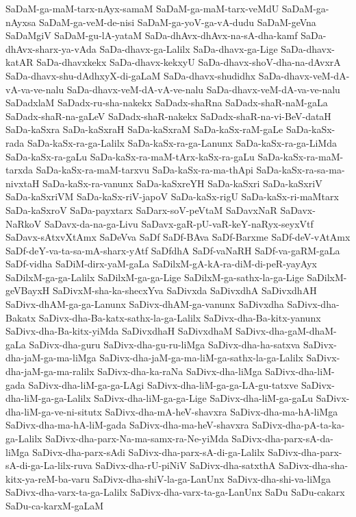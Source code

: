 {SaDaM-ga-maM-tarx-nAyx-samaM
SaDaM-ga-maM-tarx-veMdU
SaDaM-ga-nAyxsa
SaDaM-ga-veM-de-nisi
SaDaM-ga-yoV-ga-vA-dudu
SaDaM-geVna
SaDaMgiV
SaDaM-gu-lA-yataM
SaDa-dhAvx-dhAvx-na-sA-dha-kamf
SaDa-dhAvx-sharx-ya-vAda
SaDa-dhavx-ga-Lalilx
SaDa-dhavx-ga-Lige
SaDa-dhavx-katAR
SaDa-dhavxkekx
SaDa-dhavx-kekxyU
SaDa-dhavx-shoV-dha-na-dAvxrA
SaDa-dhavx-shu-dAdhxyX-di-gaLaM
SaDa-dhavx-shudidhx
SaDa-dhavx-veM-dA-vA-va-ve-nalu
SaDa-dhavx-veM-dA-vA-ve-nalu
SaDa-dhavx-veM-dA-va-ve-nalu
SaDadxlaM
SaDadx-ru-sha-nakekx
SaDadx-shaRna
SaDadx-shaR-naM-gaLa
SaDadx-shaR-na-gaLeV
SaDadx-shaR-nakekx
SaDadx-shaR-na-vi-BeV-dataH
SaDa-kaSxra
SaDa-kaSxraH
SaDa-kaSxraM
SaDa-kaSx-raM-gaLe
SaDa-kaSx-rada
SaDa-kaSx-ra-ga-Lalilx
SaDa-kaSx-ra-ga-Lanunx
SaDa-kaSx-ra-ga-LiMda
SaDa-kaSx-ra-gaLu
SaDa-kaSx-ra-maM-tArx-kaSx-ra-gaLu
SaDa-kaSx-ra-maM-tarxda
SaDa-kaSx-ra-maM-tarxvu
SaDa-kaSx-ra-ma-thApi
SaDa-kaSx-ra-sa-ma-nivxtaH
SaDa-kaSx-ra-vanunx
SaDa-kaSxreYH
SaDa-kaSxri
SaDa-kaSxriV
SaDa-kaSxriVM
SaDa-kaSx-riV-japoV
SaDa-kaSx-rigU
SaDa-kaSx-ri-maMtarx
SaDa-kaSxroV
SaDa-payxtarx
SaDarx-soV-peVtaM
SaDavxNaR
SaDavx-NaRkoV
SaDavx-da-na-ga-Livu
SaDavx-gaR-pU-vaR-keY-naRyx-seyxVtf
SaDavx-sAtxvXtAmx
SaDeVva
SaDf
SaDf-BAva
SaDf-Barxme
SaDf-deV-vAtAmx
SaDf-deY-va-ta-sa-mA-sharx-yAtf
SaDfdhA
SaDf-vaNaRH
SaDf-va-gaRM-gaLa
SaDf-vidha
SaDiM-dirx-yaM-gaLa
SaDilxM-gA-kA-ra-diM-di-peR-yayAyx
SaDilxM-ga-ga-Lalilx
SaDilxM-ga-ga-Lige
SaDilxM-ga-sathx-la-ga-Lige
SaDilxM-geVBayxH
SaDivxM-sha-ka-shecxYva
SaDivxda
SaDivxdhA
SaDivxdhAH
SaDivx-dhAM-ga-ga-Lanunx
SaDivx-dhAM-ga-vanunx
SaDivxdha
SaDivx-dha-Bakatx
SaDivx-dha-Ba-katx-sathx-la-ga-Lalilx
SaDivx-dha-Ba-kitx-yanunx
SaDivx-dha-Ba-kitx-yiMda
SaDivxdhaH
SaDivxdhaM
SaDivx-dha-gaM-dhaM-gaLa
SaDivx-dha-guru
SaDivx-dha-gu-ru-liMga
SaDivx-dha-ha-satxva
SaDivx-dha-jaM-ga-ma-liMga
SaDivx-dha-jaM-ga-ma-liM-ga-sathx-la-ga-Lalilx
SaDivx-dha-jaM-ga-ma-ralilx
SaDivx-dha-ka-raNa
SaDivx-dha-liMga
SaDivx-dha-liM-gada
SaDivx-dha-liM-ga-ga-LAgi
SaDivx-dha-liM-ga-ga-LA-gu-tatxve
SaDivx-dha-liM-ga-ga-Lalilx
SaDivx-dha-liM-ga-ga-Lige
SaDivx-dha-liM-ga-gaLu
SaDivx-dha-liM-ga-ve-ni-situtx
SaDivx-dha-mA-heV-shavxra
SaDivx-dha-ma-hA-liMga
SaDivx-dha-ma-hA-liM-gada
SaDivx-dha-ma-heV-shavxra
SaDivx-dha-pA-ta-ka-ga-Lalilx
SaDivx-dha-parx-Na-ma-samx-ra-Ne-yiMda
SaDivx-dha-parx-sA-da-liMga
SaDivx-dha-parx-sAdi
SaDivx-dha-parx-sA-di-ga-Lalilx
SaDivx-dha-parx-sA-di-ga-La-lilx-ruva
SaDivx-dha-rU-piNiV
SaDivx-dha-satxthA
SaDivx-dha-sha-kitx-ya-reM-ba-varu
SaDivx-dha-shiV-la-ga-LanUnx
SaDivx-dha-shi-va-liMga
SaDivx-dha-varx-ta-ga-Lalilx
SaDivx-dha-varx-ta-ga-LanUnx
SaDu
SaDu-cakarx
SaDu-ca-karxM-gaLaM
}
